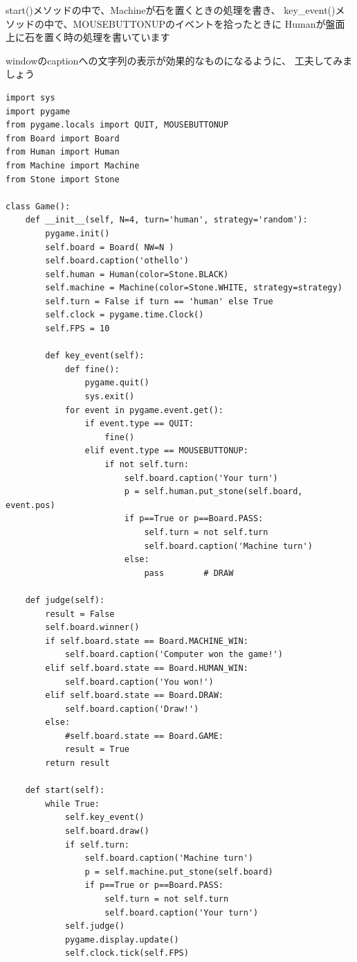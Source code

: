 \documentclass[uplatex,a4paper,11pt,oneside,openany]{jsbook}
\begin{document}
start()メソッドの中で、Machineが石を置くときの処理を書き、
key\_event()メソッドの中で、MOUSEBUTTONUPのイベントを拾ったときに
Humanが盤面上に石を置く時の処理を書いています

windowのcaptionへの文字列の表示が効果的なものになるように、
工夫してみましょう

\begin{lstlisting}[caption=Game class,label=othello09]
import sys
import pygame
from pygame.locals import QUIT, MOUSEBUTTONUP
from Board import Board
from Human import Human
from Machine import Machine
from Stone import Stone

class Game():
    def __init__(self, N=4, turn='human', strategy='random'):
        pygame.init()
        self.board = Board( NW=N )
        self.board.caption('othello')
        self.human = Human(color=Stone.BLACK)
        self.machine = Machine(color=Stone.WHITE, strategy=strategy)
        self.turn = False if turn == 'human' else True
        self.clock = pygame.time.Clock()
        self.FPS = 10

        def key_event(self):
            def fine():
                pygame.quit()
                sys.exit()
            for event in pygame.event.get():
                if event.type == QUIT:
                    fine()
                elif event.type == MOUSEBUTTONUP:
                    if not self.turn:
                        self.board.caption('Your turn')
                        p = self.human.put_stone(self.board, event.pos)
                        if p==True or p==Board.PASS:
                            self.turn = not self.turn
                            self.board.caption('Machine turn')
                        else:
                            pass        # DRAW

    def judge(self):
        result = False
        self.board.winner()
        if self.board.state == Board.MACHINE_WIN:
            self.board.caption('Computer won the game!')
        elif self.board.state == Board.HUMAN_WIN:
            self.board.caption('You won!')
        elif self.board.state == Board.DRAW:
            self.board.caption('Draw!')
        else:
            #self.board.state == Board.GAME:
            result = True
        return result

    def start(self):
        while True:
            self.key_event()
            self.board.draw()
            if self.turn:
                self.board.caption('Machine turn')
                p = self.machine.put_stone(self.board)
                if p==True or p==Board.PASS:
                    self.turn = not self.turn
                    self.board.caption('Your turn')
            self.judge()
            pygame.display.update()
            self.clock.tick(self.FPS)
\end{lstlisting}
\end{document}
